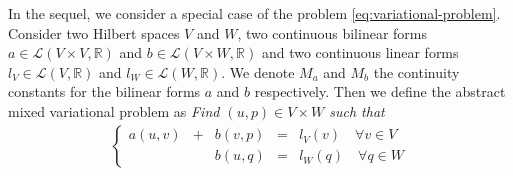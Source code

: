 In the sequel, we consider a special case of the problem \eqref{eq:variational-problem}. 
\\
\noindent
Consider two Hilbert spaces $V$ and $W$, two continuous bilinear forms
$a\in \mathcal{L}(V\times V, \mathbb{R})$ and $b\in \mathcal{L}(V\times W, \mathbb{R})$
and two continuous linear forms $l_V\in \mathcal{L}(V, \mathbb{R})$ and
$l_W\in \mathcal{L}(W, \mathbb{R})$. We denote $M_a$ and $M_b$ the continuity constants for the bilinear forms $a$ and $b$ respectively.
Then we define the abstract mixed variational problem as {\em Find $(u,p)\in V\times W$ such that}
\begin{align}
  \left\{ 
  \begin{array}{cccccc}
    a(u,v) & + & b(v,p) &=& l_V(v) \quad \forall v\in V \\
           &   & b(u,q) &=& l_W(q) \quad \forall q\in W
  \end{array} \right.
  \label{eq:abs_var_mixed}
\end{align}

